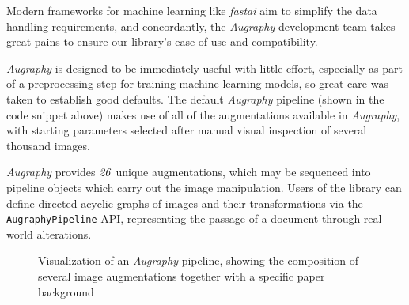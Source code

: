 \documentclass[runningheads]{llncs}
\newcommand{\numAugraphyAugmentations}{\emph{26}}
\begin{document}
Modern frameworks for machine learning like \emph{fastai} \cite{ref_fastai} aim to simplify the data handling requirements, and concordantly, the \emph{Augraphy} development team takes great pains to ensure our library's ease-of-use and compatibility.

\emph{Augraphy} is designed to be immediately useful with little effort, especially as part of a preprocessing step for training machine learning models, so great care was taken to establish good defaults.
The default \emph{Augraphy} pipeline (shown in the code snippet above) makes use of all of the augmentations available in \emph{Augraphy}, with starting parameters selected after manual visual inspection of several thousand images.

\emph{Augraphy} provides \numAugraphyAugmentations ~unique augmentations, which may be sequenced into pipeline objects which carry out the image manipulation.
Users of the library can define directed acyclic graphs of images and their transformations via the \texttt{AugraphyPipeline} API, representing the passage of a document through real-world alterations.

\begin{figure}
\centering
{}
\caption{Visualization of an \emph{Augraphy} pipeline, showing the composition of several image augmentations together with a specific paper background}
\label{fig:pipeline}
\end{figure}
\end{document}
